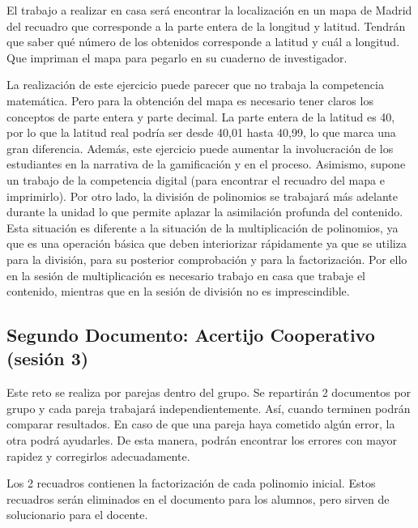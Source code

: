 El trabajo a realizar en casa será encontrar la localización en un mapa de Madrid del recuadro que corresponde a la parte entera de la longitud y latitud.
%
Tendrán que saber qué número de los obtenidos corresponde a latitud y cuál a longitud.
%
Que impriman el mapa para pegarlo en su cuaderno de investigador.

\Justificacion{}
%
La realización de este ejercicio puede parecer que no trabaja la competencia matemática. 
%
Pero para la obtención del mapa es necesario tener claros los conceptos de parte entera y parte decimal.
%
La parte entera de la latitud es 40, por lo que la latitud real podría ser desde 40,01 hasta 40,99, lo que marca una gran diferencia.
%
Además, este ejercicio puede aumentar la involucración de los estudiantes en la narrativa de la gamificación y en el proceso.
%
Asimismo, supone un trabajo de la competencia digital (para encontrar el recuadro del mapa e imprimirlo).
%
Por otro lado, la división de polinomios se trabajará más adelante durante la unidad lo que permite aplazar la asimilación profunda del contenido.
%
Esta situación es diferente a la situación de la multiplicación de polinomios, ya que es una operación básica que deben interiorizar rápidamente ya que se utiliza para la división, para su posterior comprobación y para la factorización.
%
Por ello en la sesión de multiplicación es necesario trabajo en casa que trabaje el contenido, mientras que en la sesión de división no es imprescindible.


\subsection{Segundo Documento: Acertijo Cooperativo (sesión 3)}
\label{app:ses3:coop}

Este reto se realiza por parejas dentro del grupo.
%
Se repartirán 2 documentos por grupo y cada pareja trabajará independientemente. 
%
Así, cuando terminen podrán comparar resultados. 
%
En caso de que una pareja haya cometido algún error, la otra podrá ayudarles. 
%
De esta manera, podrán encontrar los errores con mayor rapidez y corregirlos adecuadamente.

Los 2 recuadros contienen la factorización de cada polinomio inicial.
%
Estos recuadros serán eliminados en el documento para los alumnos, pero sirven de solucionario para el docente.





